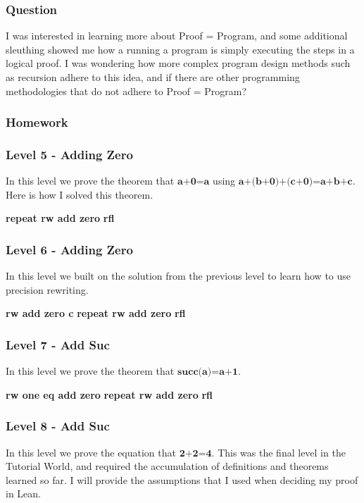 \documentclass{article}
\theoremstyle{theorem}
\theoremstyle{definition}
\theoremstyle{remark}
\begin{document}
\subsubsection*{Question} I was interested in learning more about Proof = Program, and some additional sleuthing showed me how a running a program is simply executing the steps in a logical proof. I was wondering how more complex program design methods such as recursion adhere to this idea, and if there are other programming methodologies that do not adhere to Proof = Program?

\subsubsection*{Homework}

  \subsubsection*{Level 5 - Adding Zero}
  In this level we prove the theorem that $\textbf{a+0=a}$ using $\textbf{a+(b+0)+(c+0)=a+b+c}$. Here is how I solved this theorem.

  \bgroup\obeylines
  \qquad \textbf{repeat rw add zero}
  \qquad \textbf{rfl}
  \egroup

  \subsubsection*{Level 6 - Adding Zero}
  In this level we built on the solution from the previous level to learn how to use precision rewriting.

  \bgroup\obeylines
  \qquad \textbf{rw add zero c}
  \qquad \textbf{repeat rw add zero}
  \qquad \textbf{rfl}
  \egroup

  \subsubsection*{Level 7 - Add Suc}
  In this level we prove the theorem that $\textbf{succ(a)=a+1}$.

  \bgroup\obeylines
  \qquad \textbf{rw one eq add zero}
  \qquad \textbf{repeat rw add zero}
  \qquad \textbf{rfl}
  \egroup

  \subsubsection*{Level 8 - Add Suc}
  In this level we prove the equation that $\textbf{2+2=4}$. This was the final level in the Tutorial World, and required the accumulation of definitions and theorems learned so far. I will provide the assumptions that I used when deciding my proof in Lean.
\end{document}
